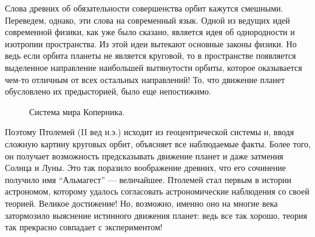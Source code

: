 \documentclass[twocolumn,10pt]{article}
\begin{document}
Слова древних об обязательности совершенства орбит кажутся смешными. Переведем, однако, эти слова на современный язык. Одной из ведущих идей современной физики, как уже было сказано, является идея об однородности и изотропии пространства. Из этой идеи вытекают основные законы физики. Но ведь если орбита планеты не является круговой, то в пространстве появляется выделенное направление наибольшей вытянутости орбиты, которое оказывается чем-то отличным от всех остальных направлений! То, что движение планет обусловлено их предысторией, было еще непостижимо.

\begin{figure}[ht]
\begin{center}
\end{center}
\caption{Система мира Коперника.}
\end{figure}

Поэтому Птолемей (II вед н.э.) исходит из геоцентрической системы и, вводя сложную картину круговых орбит, объясняет все наблюдаемые факты. Более того, он получает возможность предсказывать движение планет и даже затмения Солнца и Луны. Это так поразило воображение древних, что его сочинение получило имя ``Альмагест'' --- величайшее. Птолемей стал первым в истории астрономом, которому удалось согласовать астрономические наблюдения со своей теорией. Великое достижение! Но, возможно, именно оно на многие века затормозило выяснение истинного движения планет: ведь все так хорошо, теория так прекрасно совпадает с экспериментом!
\end{document}
